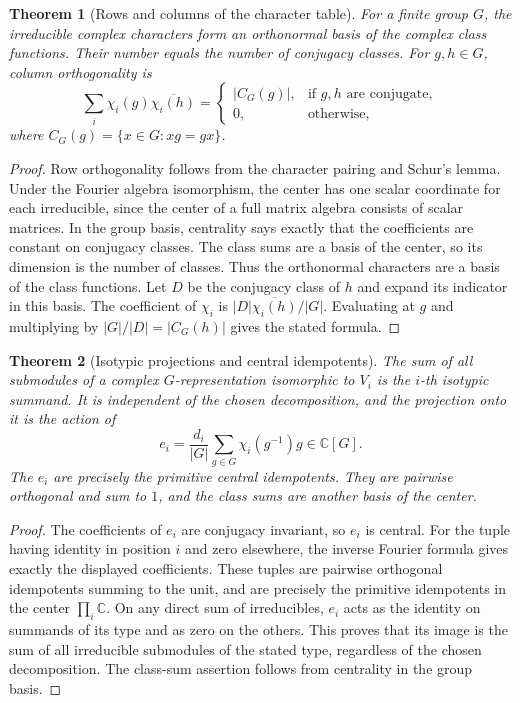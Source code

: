 \documentclass[11pt,oneside,openany]{book}
\newtheorem{theorem}{Theorem}[chapter]
\theoremstyle{definition}
\theoremstyle{remark}
\begin{document}
\begin{theorem}[Rows and columns of the character table]
\label{p103:ALG-07-C02-R02}
For a finite group \(G\), the irreducible complex characters form an
orthonormal basis of the complex class functions. Their number
equals the number of conjugacy classes. For \(g,h\in G\), column
orthogonality is
\[
 \sum_i\chi_i(g)\overline{\chi_i(h)}
    = \begin{cases}
        |C_G(g)|,& \text{if }g,h\text{ are conjugate},\\
        0,&\text{otherwise},
      \end{cases}
\]
where \(C_G(g)=\{x\in G:xg=gx\}\).
\end{theorem}

\begin{proof}
Row orthogonality follows from the character pairing and Schur's
lemma. Under the Fourier algebra isomorphism, the center has one
scalar coordinate for each irreducible, since the center of a full
matrix algebra consists of scalar matrices. In the group basis,
centrality says exactly that the coefficients are constant on
conjugacy classes. The class sums are a basis of the center, so its
dimension is the number of classes. Thus the orthonormal characters
are a basis of the class functions. Let \(D\) be the conjugacy class
of \(h\) and expand its indicator in this basis. The coefficient
of \(\chi_i\) is \(|D|\overline{\chi_i(h)}/|G|\).
Evaluating at \(g\) and multiplying by \(|G|/|D|=|C_G(h)|\)
gives the stated formula.
\end{proof}

\begin{theorem}[Isotypic projections and central idempotents]
\label{p103:ALG-07-C02-S01}
The sum of all submodules of a complex \(G\)-representation isomorphic
to \(V_i\) is the \(i\)-th isotypic summand. It is independent of the
chosen decomposition, and the projection onto it is the action of
\[
 e_i=\frac{d_i}{|G|}\sum_{g\in G}\chi_i(g^{-1})g\in\mathbb C[G].
\]
The \(e_i\) are precisely the primitive central idempotents. They are
pairwise orthogonal and sum to \(1\), and the class sums are another
basis of the center.
\end{theorem}

\begin{proof}
The coefficients of \(e_i\) are conjugacy invariant, so \(e_i\) is
central. For the tuple having identity in position \(i\) and zero
elsewhere, the inverse Fourier formula gives exactly the displayed
coefficients. These tuples are pairwise orthogonal idempotents summing
to the unit, and are precisely the primitive idempotents in the
center \(\prod_i\mathbb C\). On any direct sum of irreducibles,
\(e_i\) acts as the identity on summands of its type and as zero on
the others. This proves that its image is the sum of all irreducible
submodules of the stated type, regardless of the chosen decomposition.
The class-sum assertion follows from centrality in the group basis.
\end{proof}
\end{document}

